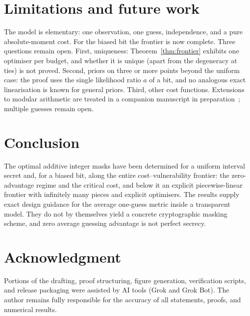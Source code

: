 \documentclass{article}
\theoremstyle{definition}
\theoremstyle{remark}
\begin{document}
\section{Limitations and future work}
The model is elementary: one observation, one guess, independence, and a pure absolute-moment cost. For the biased bit the frontier is now complete. Three questions remain open. First, uniqueness: Theorem~\ref{thm:frontier} exhibits one optimiser per budget, and whether it is unique (apart from the degeneracy at ties) is not proved. Second, priors on three or more points beyond the uniform case: the proof uses the single likelihood ratio \(a\) of a bit, and no analogous exact linearisation is known for general priors. Third, other cost functions. Extensions to modular arithmetic are treated in a companion manuscript in preparation~\cite{Pmod}; multiple guesses remain open.

\section{Conclusion}
The optimal additive integer masks have been determined for a uniform interval secret and, for a biased bit, along the entire cost--vulnerability frontier: the zero-advantage regime and the critical cost, and below it an explicit piecewise-linear frontier with infinitely many pieces and explicit optimisers. The results supply exact design guidance for the average one-guess metric inside a transparent model. They do not by themselves yield a concrete cryptographic masking scheme, and zero average guessing advantage is not perfect secrecy.

\section*{Acknowledgment}
Portions of the drafting, proof structuring, figure generation, verification scripts, and release packaging were assisted by AI tools (Grok and Grok Bot). The author remains fully responsible for the accuracy of all statements, proofs, and numerical results.
\end{document}
